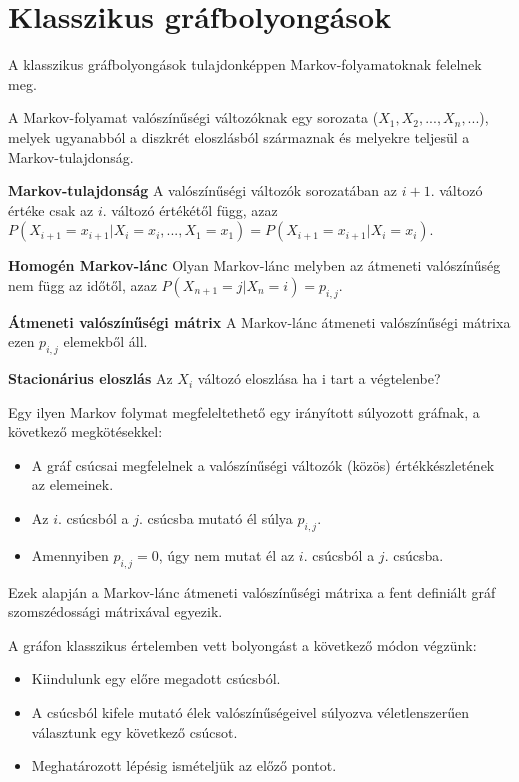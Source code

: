 \chapter{Klasszikus gráfbolyongások}

A klasszikus gráfbolyongások tulajdonképpen Markov-folyamatoknak felelnek meg.

A Markov-folyamat valószínűségi változóknak egy sorozata ($X_1, X_2, ..., X_n, ...$),
melyek ugyanabból a diszkrét eloszlásból származnak és melyekre teljesül a
Markov-tulajdonság.

\textbf{Markov-tulajdonság} A valószínűségi változók sorozatában
az $i+1.$ változó értéke csak az $i.$ változó értékétől függ, azaz
$P(X_{i+1} = x_{i+1} | X_i = x_i, ..., X_1 = x_1) = P(X_{i+1} = x_{i+1} | X_i = x_i)$.

\textbf{Homogén Markov-lánc} Olyan Markov-lánc melyben az átmeneti
valószínűség nem függ az időtől, azaz $P(X_{n+1} = j | X_n = i) = p_{i,j}$.

\textbf{Átmeneti valószínűségi mátrix}
A Markov-lánc átmeneti valószínűségi mátrixa ezen $p_{i,j}$ elemekből áll.

\textbf{Stacionárius eloszlás} Az $X_i$ változó eloszlása ha i tart
a végtelenbe?

Egy ilyen Markov folymat megfeleltethető egy irányított súlyozott gráfnak, a következő megkötésekkel:
\begin{itemize}
  \item A gráf csúcsai megfelelnek a valószínűségi változók (közös) értékkészletének az elemeinek.
  \item Az $i.$ csúcsból a $j.$ csúcsba mutató él súlya $p_{i,j}$.
  \item Amennyiben $p_{i,j}=0$, úgy nem mutat él az $i.$ csúcsból a $j.$ csúcsba.
\end{itemize}

Ezek alapján a Markov-lánc átmeneti valószínűségi mátrixa a fent definiált gráf
szomszédossági mátrixával egyezik.

A gráfon klasszikus értelemben vett bolyongást a következő módon végzünk:
\begin{itemize}
  \item Kiindulunk egy előre megadott csúcsból.
  \item A csúcsból kifele mutató élek valószínűségeivel súlyozva véletlenszerűen
        választunk egy következő csúcsot.
  \item Meghatározott lépésig ismételjük az előző pontot.
\end{itemize}

